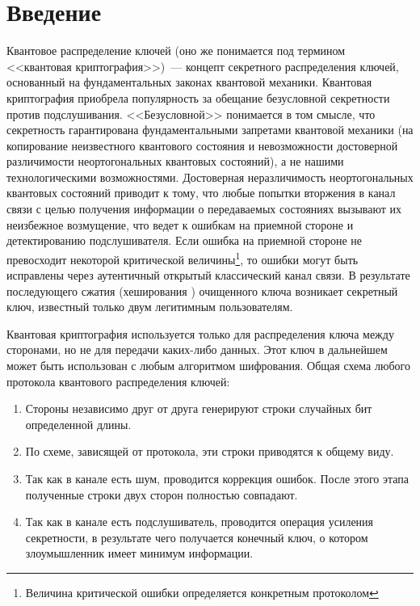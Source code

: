 \chapter*{Введение}				%

Квантовое распределение ключей (оно же понимается под термином <<квантовая криптография>>)~--- концепт секретного распределения ключей, основанный на фундаментальных законах квантовой механики.
Квантовая криптография \cite{bb84, e91, gisin2002Quacry, scarani2009secpraquakeydis, hughes2011Refquacry, lam2013QuacryConimp} приобрела популярность за обещание безусловной секретности против подслушивания. <<Безусловной>> понимается в том смысле, что секретность гарантирована
фундаментальными запретами квантовой механики (на копирование неизвестного квантового состояния и невозможности достоверной различимости неортогональных квантовых состояний)\cite{bb84, non_orthogonal_states_discrimination_theorem, no_cloning_theorem}, 
а не нашими технологическими возможностями. Достоверная неразличимость неортогональных квантовых состояний приводит к тому, что любые попытки вторжения в канал связи с целью получения информации о передаваемых состояниях вызывают их неизбежное возмущение, что ведет к ошибкам на приемной стороне и детектированию подслушивателя.
Если ошибка на приемной стороне не превосходит некоторой критической величины\footnote{Величина критической ошибки определяется конкретным протоколом}, то ошибки могут быть исправлены через аутентичный открытый классический канал связи. В результате последующего сжатия (хеширования \cite{privacy_amplification}) очищенного ключа возникает секретный ключ, известный только двум легитимным пользователям.

Квантовая криптография используется только для распределения ключа между сторонами, но не для передачи каких-либо данных. Этот ключ в дальнейшем может быть использован с любым алгоритмом шифрования.
Общая схема любого протокола квантового распределения ключей:
\begin{enumerate}
  \item Стороны независимо друг от друга генерируют строки случайных бит определенной длины.
  \item По схеме, зависящей от протокола, эти строки приводятся к общему виду.
  \item Так как в канале есть шум, проводится коррекция ошибок. После этого этапа полученные строки двух сторон полностью совпадают.
  \item Так как в канале есть подслушиватель, проводится операция усиления секретности, в результате чего получается конечный ключ, о котором злоумышленник имеет минимум информации.
\end{enumerate}

